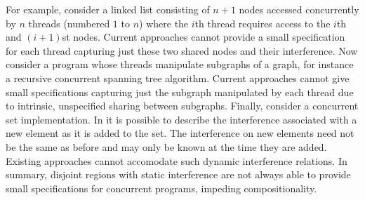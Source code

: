 For example, consider a linked list consisting of $n+1$ nodes accessed
concurrently by $n$ threads (numbered $1$ to $n$) where the $i$th
thread requires access to the $i$th and $(i+1)$st nodes. Current
approaches cannot provide a small specification for each thread capturing just these two shared nodes and their interference. Now consider a program whose threads manipulate subgraphs of a graph, for instance  a recursive
concurrent spanning tree algorithm. Current approaches cannot give small specifications capturing just the subgraph manipulated by each thread due to intrinsic, unspecified sharing  between subgraphs.
Finally, consider a concurrent set implementation. In \colosl it is
possible to describe the interference associated with a new element as it is added to the set. The interference on new elements need not be the same as before and may only be known at the time they are added. Existing approaches cannot accomodate such dynamic interference relations.
In summary, disjoint regions with static interference are not always able to provide small
specifications for concurrent programs, impeding 
compositionality.




